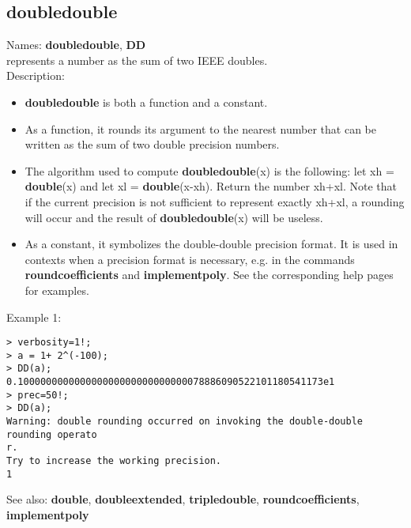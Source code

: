 \subsection{ doubledouble }
\noindent Names: \textbf{doubledouble}, \textbf{DD}\\
represents a number as the sum of two IEEE doubles.\\

\noindent Description: \begin{itemize}

\item \textbf{doubledouble} is both a function and a constant.

\item As a function, it rounds its argument to the nearest number that can be written
   as the sum of two double precision numbers.

\item The algorithm used to compute \textbf{doubledouble}(x) is the following: let xh = \textbf{double}(x)
   and let xl = \textbf{double}(x-xh). Return the number xh+xl. Note that if the current 
   precision is not sufficient to represent exactly xh+xl, a rounding will occur
   and the result of \textbf{doubledouble}(x) will be useless.

\item As a constant, it symbolizes the double-double precision format. It is used in 
   contexts when a precision format is necessary, e.g. in the commands 
   \textbf{roundcoefficients} and \textbf{implementpoly}.
   See the corresponding help pages for examples.
\end{itemize}
\noindent Example 1: 
\begin{center}\begin{minipage}{15cm}\begin{Verbatim}[frame=single]
> verbosity=1!;
> a = 1+ 2^(-100);
> DD(a);
0.100000000000000000000000000000078886090522101180541173e1
> prec=50!;
> DD(a);
Warning: double rounding occurred on invoking the double-double rounding operato
r.
Try to increase the working precision.
1
\end{Verbatim}
\end{minipage}\end{center}
See also: \textbf{double}, \textbf{doubleextended}, \textbf{tripledouble}, \textbf{roundcoefficients}, \textbf{implementpoly}
